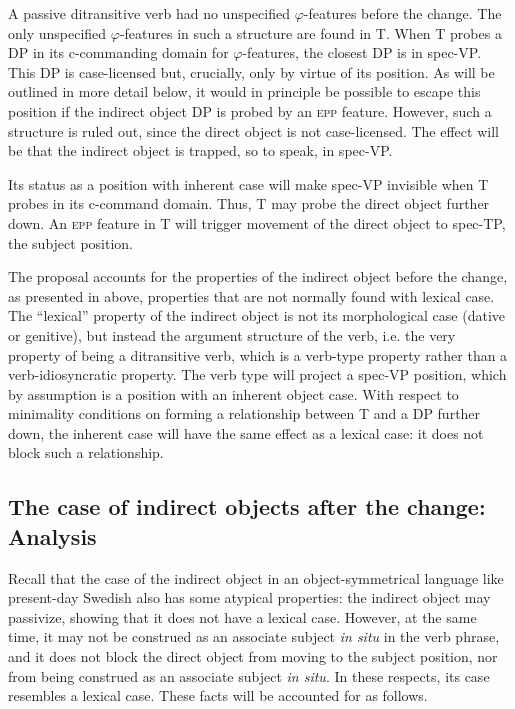 \documentclass[output=paper]{langscibook}
\begin{document}
A passive ditransitive verb had no unspecified $\varphi $-features before the change. The only unspecified $\varphi $-features in such a structure are found in T. When T probes a DP in its c-commanding domain for $\varphi $-features, the closest DP is in spec-VP. This DP is case-licensed but, crucially, only by virtue of its position. As will be outlined in more detail below, it would in principle be possible to escape this position if the indirect object DP is probed by an \textsc{epp} feature. However, such a structure is ruled out, since the direct object is not case-licensed. The effect will be that the indirect object is trapped, so to speak, in spec-VP. 



Its status as a position with inherent case will make spec-VP invisible when T probes in its c-command domain. Thus, T may probe the direct object further down. An \textsc{epp} feature in T will trigger movement of the direct object to spec-TP, the subject position.


\begin{sloppypar}
The proposal accounts for the properties of the indirect object before the change, as presented in  above, properties that are not normally found with lexical case. The “lexical” property of the indirect object is not its morphological case (dative or genitive), but instead the argument structure of the verb, i.e. the very property of being a ditransitive verb, which is a verb-type property rather than a verb-idiosyncratic property. The verb type will project a spec-VP position, which by assumption is a position with an inherent object case. With respect to minimality conditions on forming a relationship between T and a DP further down, the inherent case will have the same effect as a lexical case: it does not block such a relationship.
\end{sloppypar}

\subsection{The case of indirect objects after the change: Analysis}\label{sec:falk:4.3}


Recall that the case of the indirect object in an object-symmetrical language like present-day Swedish also has some atypical properties: the indirect object may passivize, showing that it does not have a lexical case. However, at the same time, it may not be construed as an associate subject \textit{in situ} in the verb phrase, and it does not block the direct object from moving to the subject position, nor from being construed as an associate subject \textit{in situ}. In these respects, its case resembles a lexical case. These facts will be accounted for as follows. 
\end{document}
